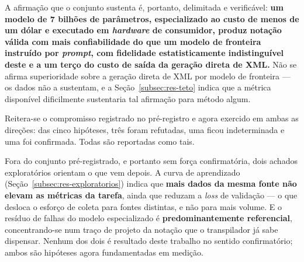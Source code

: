 A afirmação que o conjunto sustenta é, portanto, delimitada e verificável: \textbf{um modelo de 7 bilhões de parâmetros, especializado ao custo de menos de um dólar e executado em \textit{hardware} de consumidor, produz notação válida com mais confiabilidade do que um modelo de fronteira instruído por \textit{prompt}, com fidelidade estatisticamente indistinguível deste e a um terço do custo de saída da geração direta de XML.} Não se afirma superioridade sobre a geração direta de XML por modelo de fronteira --- os dados não a sustentam, e a Seção~\ref{subsec:res-teto} indica que a métrica disponível dificilmente sustentaria tal afirmação para método algum.

Reitera-se o compromisso registrado no pré-registro e agora exercido em ambas as direções: das cinco hipóteses, três foram refutadas, uma ficou indeterminada e uma foi confirmada. Todas são reportadas como tais.

Fora do conjunto pré-registrado, e portanto sem força confirmatória, dois achados exploratórios orientam o que vem depois. A curva de aprendizado (Seção~\ref{subsec:res-exploratorios}) indica que \textbf{mais dados da mesma fonte não elevam as métricas da tarefa}, ainda que reduzam a \textit{loss} de validação --- o que desloca o esforço de coleta para fontes distintas, e não para mais volume. E o resíduo de falhas do modelo especializado é \textbf{predominantemente referencial}, concentrando-se num traço de projeto da notação que o transpilador já sabe dispensar. Nenhum dos dois é resultado deste trabalho no sentido confirmatório; ambos são hipóteses agora fundamentadas em medição.
